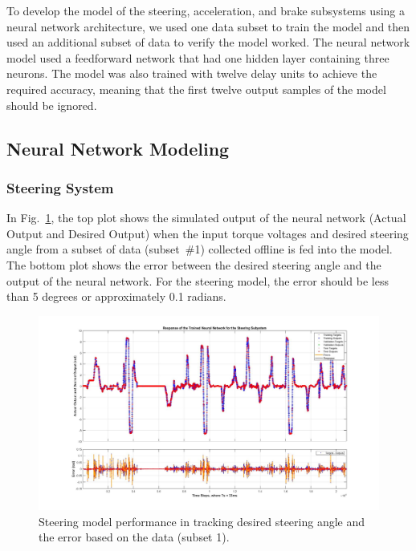 \documentclass[conference]{IEEEtran}
\begin{document}
To develop the model of the steering, acceleration, and brake subsystems using a neural network architecture, we used one data subset to train the model and then used an additional subset of data to verify the model worked. The neural network model used a feedforward network that had one hidden layer containing three neurons. The model was also trained with twelve delay units to achieve the required accuracy, meaning that the first twelve output samples of the model should be ignored.
\subsection{Neural Network Modeling}
\label{sec:NN-Modeling}

\subsubsection{Steering System}
%
In Fig.~\ref{fig:InitialSteeringModel}, the top plot shows the simulated output of the neural network (Actual Output and Desired Output) when the input torque voltages and desired steering angle from a subset of data (subset~\#1) collected offline is fed into the model. The bottom plot shows the error between the desired steering angle and the output of the neural network. For the steering model, the error should be less than 5 degrees or approximately 0.1 radians. %
%
\begin{figure}[htbp]
  \centering
  \includegraphics[width=0.90\linewidth]{figs/img/steeringNeuralNetworkTrainedOutput}
  \caption{Steering model performance in tracking desired steering angle and the error based on the data (subset 1).}
  \label{fig:InitialSteeringModel}
\end{figure}
%
\end{document}
